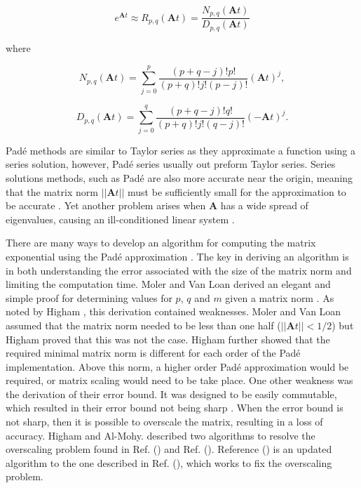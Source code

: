 \begin{equation}
    e^{\boldsymbol{A}t} \approx R_{p,q}(\boldsymbol{A}t) = \frac{N_{p,q}(\boldsymbol{A}t)}{D_{p,q}(\boldsymbol{A}t)}
    \label{eq:padeApprox}
\end{equation}

\noindent where

\begin{equation}
    N_{p,q}(\boldsymbol{A}t) = \sum_{j=0}^{p}\frac{(p + q - j)!p!}{(p + q)!j!(p - j)!}(\boldsymbol{A}t)^{j},
\end{equation}

\begin{equation}
    D_{p,q}(\boldsymbol{A}t) = \sum_{j=0}^{q}\frac{(p + q - j)!q!}{(p + q)!j!(q - j)!}(-\boldsymbol{A}t)^{j}.
\end{equation}

Pad\'e methods are similar to Taylor series as they approximate a function using a series solution, however, Pad\'e series usually out preform Taylor series. Series solutions methods, such as Pad\'e are also more accurate near the origin, meaning that the matrix norm $||\boldsymbol{A}t||$ must be sufficiently small for the approximation to be accurate \cite{pusa2010}. Yet another problem arises when $\boldsymbol{A}$ has a wide spread of eigenvalues, causing an ill-conditioned linear system  \cite{exokit} \cite{moler2003}. 

There are many ways to develop an algorithm for computing the matrix exponential using the Pad\'e approximation \cite{exokit} \cite{higham2005} \cite{higham2009}. The key in deriving an algorithm is in both understanding the error associated with the size of the matrix norm and limiting the computation time. Moler and Van Loan derived an elegant and simple proof for determining values for $p$, $q$ and $m$ given a matrix norm \cite{moler2003}. As noted by Higham \cite{higham2005}, this derivation contained weaknesses. Moler and Van Loan assumed that the matrix norm needed to be less than one half ($||\boldsymbol{A}t|| < 1/2$) but Higham proved that this was not the case. Higham further showed that the required minimal matrix norm is different for each order of the Pad\'e implementation. Above this norm, a higher order Pad\'e approximation would be required, or matrix scaling would need to be take place. One other weakness was the derivation of their error bound. It was designed to be easily commutable, which resulted in their error bound not being sharp \cite{higham2005}. When the error bound is not sharp, then it is possible to overscale the matrix, resulting in a loss of accuracy. Higham and Al-Mohy. described two algorithms to resolve the overscaling problem found in Ref. (\cite{higham2005}) and  Ref. (\cite{higham2009}). Reference (\cite{higham2009}) is an updated algorithm to the one described in Ref. (\cite{higham2005}), which works to fix the overscaling problem.


